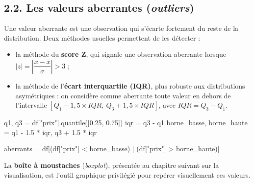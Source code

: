 \documentclass[
  french,
  letterpaper,
  open=any]{scrbook}
\newenvironment{Shaded}{\begin{snugshade}}{\end{snugshade}}
\newcommand{\FloatTok}[1]{\textcolor[rgb]{0.68,0.00,0.00}{#1}}
\newcommand{\NormalTok}[1]{\textcolor[rgb]{0.00,0.23,0.31}{#1}}
\newcommand{\OperatorTok}[1]{\textcolor[rgb]{0.37,0.37,0.37}{#1}}
\newcommand{\StringTok}[1]{\textcolor[rgb]{0.13,0.47,0.30}{#1}}
\providecommand{\tightlist}{%
  \setlength{\itemsep}{0pt}\setlength{\parskip}{0pt}}
\theoremstyle{definition}
\theoremstyle{definition}
\theoremstyle{remark}
\begin{document}
\subsection{\texorpdfstring{2.2. Les valeurs aberrantes
(\emph{outliers})}{2.2. Les valeurs aberrantes (outliers)}}\label{les-valeurs-aberrantes-outliers}

Une valeur aberrante est une observation qui s'écarte fortement du reste
de la distribution. Deux méthodes usuelles permettent de les détecter :

\begin{itemize}
\tightlist
\item
  la méthode du \textbf{score Z}, qui signale une observation aberrante
  lorsque \(|z| = \left|\dfrac{x - \bar{x}}{\sigma}\right| > 3\) ;
\item
  la méthode de l'\textbf{écart interquartile (IQR)}, plus robuste aux
  distributions asymétriques : on considère comme aberrante toute valeur
  en dehors de l'intervalle
  \([Q_1 - 1{,}5 \times IQR,\ Q_3 + 1{,}5 \times IQR]\), avec
  \(IQR = Q_3 - Q_1\).
\end{itemize}

\begin{Shaded}
\begin{Highlighting}[]
\NormalTok{q1, q3 }\OperatorTok{=}\NormalTok{ df[}\StringTok{"prix"}\NormalTok{].quantile([}\FloatTok{0.25}\NormalTok{, }\FloatTok{0.75}\NormalTok{])}
\NormalTok{iqr }\OperatorTok{=}\NormalTok{ q3 }\OperatorTok{{-}}\NormalTok{ q1}
\NormalTok{borne\_basse, borne\_haute }\OperatorTok{=}\NormalTok{ q1 }\OperatorTok{{-}} \FloatTok{1.5} \OperatorTok{*}\NormalTok{ iqr, q3 }\OperatorTok{+} \FloatTok{1.5} \OperatorTok{*}\NormalTok{ iqr}

\NormalTok{aberrants }\OperatorTok{=}\NormalTok{ df[(df[}\StringTok{"prix"}\NormalTok{] }\OperatorTok{\textless{}}\NormalTok{ borne\_basse) }\OperatorTok{|}\NormalTok{ (df[}\StringTok{"prix"}\NormalTok{] }\OperatorTok{\textgreater{}}\NormalTok{ borne\_haute)]}
\end{Highlighting}
\end{Shaded}

La \textbf{boîte à moustaches} (\emph{boxplot}), présentée au chapitre
suivant sur la visualisation, est l'outil graphique privilégié pour
repérer visuellement ces valeurs.
\end{document}
